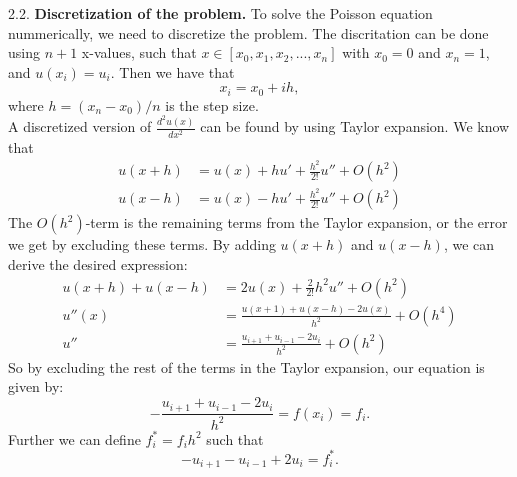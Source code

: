 \documentclass[a4paper,10pt,]{article}
\newcommand{\dder}[2]{\frac{d^2 #1}{d #2 ^2}}
\begin{document}
2.2. \textbf{Discretization of the problem.} 
To solve the Poisson equation nummerically, we need to discretize the problem. The discritation can be done using $n+1$ x-values, such that $x \in [x_0, x_1, x_2, ..., x_n]$ with $x_0 = 0$ and $x_n = 1$, and $u(x_i) = u_i$. Then we have that 
$$ x_i = x_0 + ih, $$
where $h = (x_n - x_0)/n$ is the step size. \\

A discretized version of $\dder{u(x)}{x}$ can be found by using Taylor expansion. We know that
\begin{align*}
u(x + h) &= u(x) + h u' + \frac{h^2}{2!} u'' + O(h^2) \\
u(x - h) &= u(x) - h u' + \frac{h^2}{2!} u'' + O(h^2) 
\end{align*} 
The $O(h^2)$-term is the remaining terms from the Taylor expansion, or the error we get by excluding these terms. By adding $u(x + h)$ and $u(x-h)$, we can derive the desired expression:
\begin{align*}
u(x + h) + u(x - h) &= 2 u(x) + \frac{2}{2!} h^2 u'' + O(h^2) \\
u''(x) &= \frac{u(x+1) + u(x-h) - 2u(x)}{h^2} + O(h^4) \\
u'' &=  \frac{u_{i+1} + u_{i-1} - 2u_i}{h^2}+ O(h^2)
\end{align*}
So by excluding the rest of the terms in the Taylor expansion, our equation is given by:
$$- \frac{u_{i+1} + u_{i-1} - 2u_i}{h^2} = f(x_i) = f_i. $$
Further we can define $f_i^* = f_i h^2$ such that 
$$- u_{i+1} - u_{i-1} + 2u_i = f_i^* .$$
\end{document}

